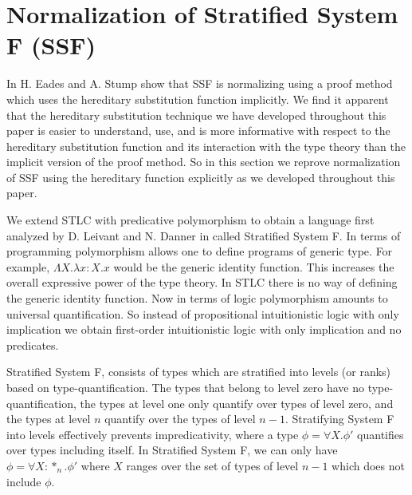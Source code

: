 \section{Normalization of Stratified System F (SSF)}
\label{subsec:normalization_stratified_system_f}
In \cite{Eades:2010} H. Eades and A. Stump show that SSF is
normalizing using a proof method which uses the hereditary
substitution function implicitly.  We find it apparent that the
hereditary substitution technique we have developed throughout this
paper is easier to understand, use, and is more informative with
respect to the hereditary substitution function and its interaction
with the type theory than the implicit version of the proof method.
So in this section we reprove normalization of SSF using the
hereditary function explicitly as we developed throughout this paper.

We extend STLC with predicative polymorphism to obtain a language
first analyzed by D. Leivant and N. Danner in \cite{Leivant:1991}
called Stratified System F.  In terms of programming polymorphism
allows one to define programs of generic type.  For example, $\Lambda
X.\lambda x:X.x$ would be the generic identity function.  This
increases the overall expressive power of the type theory.  In STLC
there is no way of defining the generic identity function.  Now in
terms of logic polymorphism amounts to universal quantification.  So
instead of propositional intuitionistic logic with only implication we
obtain first-order intuitionistic logic with only implication and no
predicates.

Stratified System F, consists of types which are stratified into
levels (or ranks) based on type-quantification.  The types that belong
to level zero have no type-quantification, the types at level one only
quantify over types of level zero, and the types at level $n$ quantify
over the types of level $n-1$.  Stratifying System F into levels
effectively prevents impredicativity, where a type $\phi = \forall
X.\phi'$ quantifies over types including itself.  In Stratified System
F, we can only have $\phi = \forall X:*_n.\phi'$ where $X$ ranges over
the set of types of level $n-1$ which does not include $\phi$.

